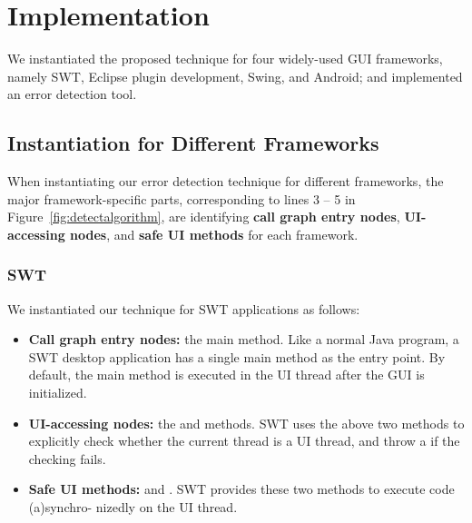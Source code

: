 
\tinystep
\tinystep
\section{Implementation}
\label{sec:implementation}

We instantiated the proposed technique for four widely-used
GUI frameworks, namely SWT, Eclipse plugin development, Swing, and Android;
and implemented an error detection tool.



\tinystep


\subsection{Instantiation for Different Frameworks}
\label{sec:platforms}

When instantiating our error detection technique for different
frameworks, the major framework-specific parts, corresponding to
lines 3 -- 5 in Figure~\ref{fig:detectalgorithm}, are identifying
\textbf{call graph entry nodes}, \textbf{UI-accessing nodes},
and \textbf{safe UI methods} for each framework.

\tinystep
\subsubsection{SWT}

 We instantiated our technique for SWT applications as follows:

\begin{itemize}
\smallstep

\item \textbf{Call graph entry nodes: } the main method. Like a normal Java program,
a SWT desktop application has a single main method as the entry point. By default,
the main method is executed in the UI thread after the GUI
is initialized.

\smallstep

\item \textbf{UI-accessing nodes: } the 
and   methods. SWT uses the above
two methods to explicitly check whether the current thread is a UI thread,
and throw a  if the checking fails.
\smallstep

\item \textbf{Safe UI methods: } 
and . SWT provides these two methods
to execute code (a)synchro- nizedly on the UI thread.

\end{itemize}

